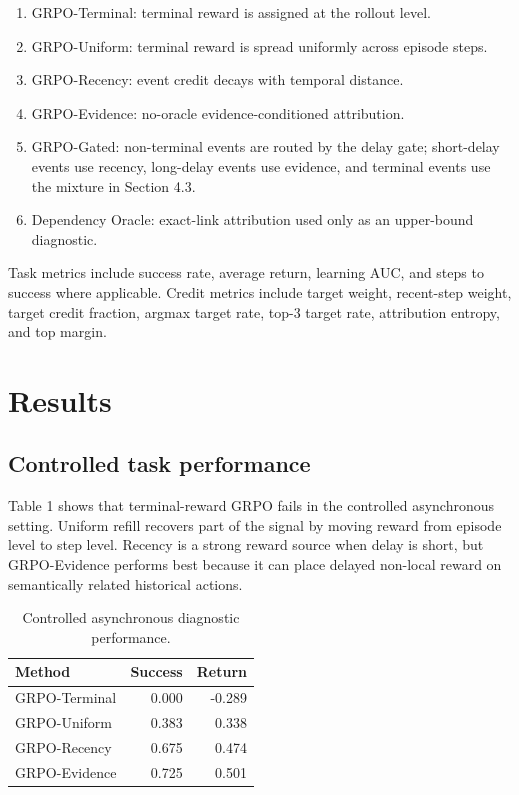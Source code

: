 \documentclass[letterpaper]{article} %
\begin{document}
\begin{enumerate}
\item GRPO-Terminal: terminal reward is assigned at the rollout level.
\item GRPO-Uniform: terminal reward is spread uniformly across episode steps.
\item GRPO-Recency: event credit decays with temporal distance.
\item GRPO-Evidence: no-oracle evidence-conditioned attribution.
\item GRPO-Gated: non-terminal events are routed by the delay gate; short-delay events use recency, long-delay events use evidence, and terminal events use the mixture in Section 4.3.
\item Dependency Oracle: exact-link attribution used only as an upper-bound diagnostic.
\end{enumerate}
Task metrics include success rate, average return, learning AUC, and steps to success where applicable. Credit metrics include target weight, recent-step weight, target credit fraction, argmax target rate, top-3 target rate, attribution entropy, and top margin.

\section{Results}

\subsection{Controlled task performance}

Table 1 shows that terminal-reward GRPO fails in the controlled asynchronous setting. Uniform refill recovers part of the signal by moving reward from episode level to step level. Recency is a strong reward source when delay is short, but GRPO-Evidence performs best because it can place delayed non-local reward on semantically related historical actions.

\begin{table}[t]
\centering
\small
\caption{Controlled asynchronous diagnostic performance.}
\label{tab:synthetic-performance}
\begin{tabular}{lrr}
\toprule
Method & Success & Return \\
\midrule
GRPO-Terminal & 0.000 & -0.289 \\
GRPO-Uniform & 0.383 & 0.338 \\
GRPO-Recency & 0.675 & 0.474 \\
GRPO-Evidence & 0.725 & 0.501 \\
\bottomrule
\end{tabular}
\end{table}
\end{document}
